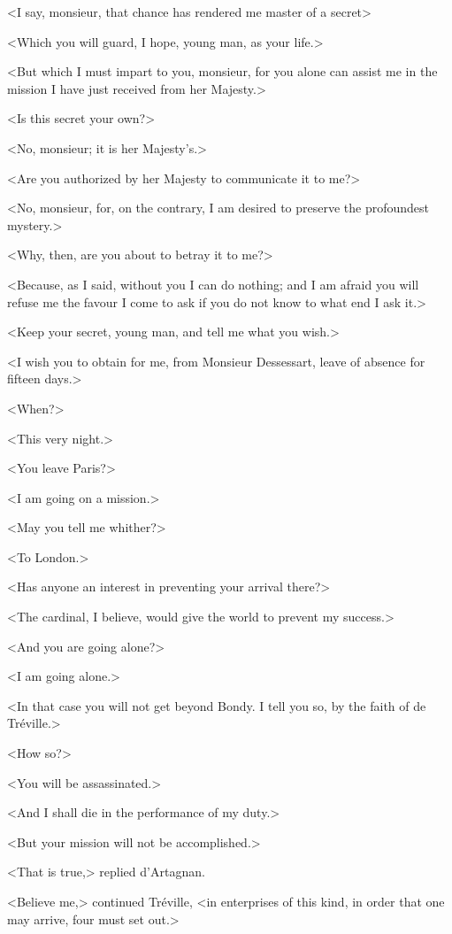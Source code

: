 <I say, monsieur, that chance has rendered me master of a secret\longdash> 

<Which you will guard, I hope, young man, as your life.> 

<But which I must impart to you, monsieur, for you alone can assist me in the mission I have just received from her Majesty.> 

<Is this secret your own?> 

<No, monsieur; it is her Majesty's.> 

<Are you authorized by her Majesty to communicate it to me?> 

<No, monsieur, for, on the contrary, I am desired to preserve the profoundest mystery.> 

<Why, then, are you about to betray it to me?> 

<Because, as I said, without you I can do nothing; and I am afraid you will refuse me the favour I come to ask if you do not know to what end I ask it.> 

<Keep your secret, young man, and tell me what you wish.> 

<I wish you to obtain for me, from Monsieur Dessessart, leave of absence for fifteen days.> 

<When?> 

<This very night.> 

<You leave Paris?> 

<I am going on a mission.> 

<May you tell me whither?> 

<To London.> 

<Has anyone an interest in preventing your arrival there?> 

<The cardinal, I believe, would give the world to prevent my success.> 

<And you are going alone?> 

<I am going alone.> 

<In that case you will not get beyond Bondy. I tell you so, by the faith of de Tréville.> 

<How so?> 

<You will be assassinated.> 

<And I shall die in the performance of my duty.> 

<But your mission will not be accomplished.> 

<That is true,> replied d'Artagnan. 

<Believe me,> continued Tréville, <in enterprises of this kind, in order that one may arrive, four must set out.> 

